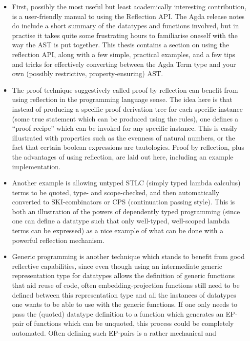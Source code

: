 \documentclass[a4paper]{article}
\begin{document}
\begin{itemize}
  \item First, possibly the most useful but least academically
interesting contribution, is a user-friendly manual to using the
Reflection API. The Agda release notes\cite{agda-relnotes-228} do
include a short summary of the datatypes and functions involved, but
in practise it takes quite some frustrating hours to familiarise
oneself with the way the AST is put together. This thesis contains a
section on using the reflection API, along with a few simple,
practical examples, and a few tips and tricks for effectively
converting between the Agda Term type and your own (possibly
restrictive, property-ensuring) AST.
  \item The proof technique suggestively called proof by reflection
can benefit from using reflection in the programming language
sense. The idea here is that instead of producing a specific proof
derivation tree for each specific instance (some true statement which
can be produced using the rules), one defines a ``proof recipe'' which
can be invoked for any specific instance. This is easily illustrated
with properties such as the evenness of natural numbers, or the fact
that certain boolean expressions are tautologies. Proof by reflection,
plus the advantages of using reflection, are laid out here, including
an example implementation.
  \item Another example is allowing untyped STLC (simply typed lambda
calculus) terms to be quoted, type- and scope-checked, and then
automatically converted to SKI-combinators or CPS (continuation
passing style). This is both an illustration of the powers of
dependently typed programming (since one can define a datatype such
that only well-typed, well-scoped lambda terms can be expressed) as a
nice example of what can be done with a powerful reflection mechanism.
  \item Generic programming is another technique which stands to
benefit from good reflective capabilities, since even though using an
intermediate generic representation type for datatypes allows the
definition of generic functions that aid reuse of code, often
embedding-projection functions still need to be defined between this
representation type and all the instances of datatypes one wants to be
able to use with the generic functions. If one only needs to pass the
(quoted) datatype definition to a function which generates an EP-pair
of functions which can be unquoted, this process could be completely
automated. Often defining such EP-pairs is a rather mechanical and

\end{itemize}
\end{document}
